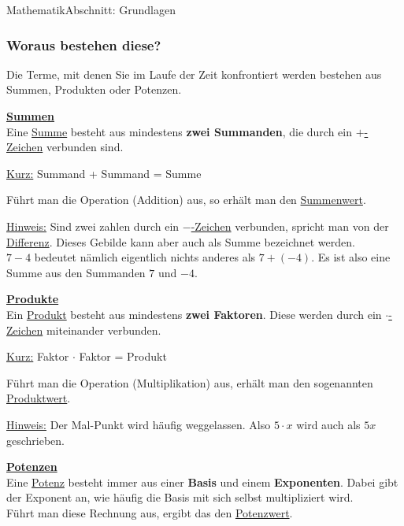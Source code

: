 \documentclass[11pt,twocolumn,oneside,openany,headings=optiontotoc,11pt,numbers=noenddot]{article}
\begin{document}
\begin{worksheet}{}{Mathematik}{Abschnitt: Grundlagen}
		\subsubsection*{Woraus bestehen diese?}
		Die Terme, mit denen Sie im Laufe der Zeit konfrontiert werden bestehen aus Summen, Produkten oder Potenzen.\\
		\par\noindent
		\textbf{\underline{Summen}}\\
		Eine \underline{Summe} besteht aus mindestens \textbf{zwei Summanden}, die durch ein \underline{\(+\)-Zeichen} verbunden sind.
		\begin{framed}\noindent
			\underline{Kurz:} Summand + Summand = Summe
		\end{framed}
		\noindent
		Führt man die Operation (Addition) aus, so erhält man den \underline{Summenwert}.\\
		\par\noindent
		\underline{Hinweis:} Sind zwei zahlen durch ein \underline{\glqq{}\(-\)\grqq{}-Zeichen} verbunden, spricht man von der \underline{Differenz}. Dieses Gebilde kann aber auch als Summe bezeichnet werden.\\
		\(7-4\) bedeutet nämlich eigentlich nichts anderes als \(7 + (-4)\). Es ist also eine Summe aus den Summanden \(7\) und \(-4\).\\
		\par\noindent
		\textbf{\underline{Produkte}}\\
		Ein \underline{Produkt} besteht aus mindestens \textbf{zwei Faktoren}. Diese werden durch ein \underline{\glqq{}\(\cdot\)\grqq{}-Zeichen} miteinander verbunden.
		\begin{framed}
			\noindent
			\underline{Kurz:} Faktor $\cdot$ Faktor = Produkt
		\end{framed}
		\noindent
		Führt man die Operation (Multiplikation) aus, erhält man den sogenannten \underline{Produktwert}.\\
		\par\noindent
		\underline{Hinweis:} Der Mal-Punkt wird häufig weggelassen. Also \(5\cdot x\) wird auch als \(5x\) geschrieben.\\
		\par\noindent
		\textbf{\underline{Potenzen}}\\
		Eine \underline{Potenz} besteht immer aus einer \textbf{Basis} und einem \textbf{Exponenten}. Dabei gibt der Exponent an, wie häufig die Basis mit sich selbst multipliziert wird.\\
		Führt man diese Rechnung aus, ergibt das den \underline{Potenzwert}.

\end{worksheet}
\end{document}
